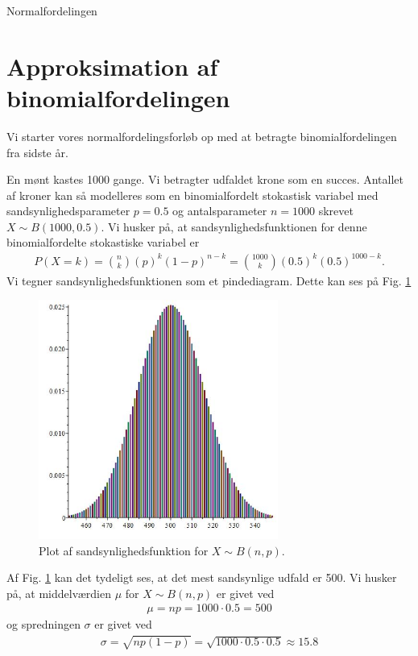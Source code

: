 \begin{center}
	\Huge
	Normalfordelingen
\end{center}
\section*{Approksimation af binomialfordelingen}
Vi starter vores normalfordelingsforløb op med at betragte binomialfordelingen fra sidste år.

\begin{exa}\label{exa:bin1}
	En mønt kastes 1000 gange. Vi betragter udfaldet krone som en succes. Antallet af kroner kan så modelleres som en binomialfordelt stokastisk variabel med sandsynlighedsparameter $p = 0.5$ og
	antalsparameter $n = 1000$ skrevet $X \sim B(1000,0.5)$. Vi husker på, at sandsynlighedsfunktionen for denne binomialfordelte stokastiske variabel er
	\begin{align*}
		P(X=k) =\binom{n}{k}(p)^k(1-p)^{n-k}= \binom{1000}{k}(0.5)^k(0.5)^{1000-k}.
	\end{align*}
	Vi tegner sandsynlighedsfunktionen som et pindediagram. Dette kan ses på Fig. \ref{fig:binompinde}
	\begin{figure}[H]
		\center
		\includegraphics[width=0.7\textwidth]{Billeder/binompinde.jpg}
		\caption{Plot af sandsynlighedsfunktion for $X \sim B(n,p)$.}
		\label{fig:binompinde}
	\end{figure}
	Af Fig. \ref{fig:binompinde} kan det tydeligt ses, at det mest sandsynlige udfald er 500. 
	Vi husker på, at middelværdien $\mu$ for $X \sim B(n,p)$ er givet ved
	\begin{align*}
		\mu = np = 1000\cdot 0.5 = 500
	\end{align*}
	og spredningen $\sigma$ er givet ved
	\begin{align*}
		\sigma = \sqrt{np(1-p)} = \sqrt{1000\cdot 0.5\cdot 0.5} \approx 15.8
	\end{align*}		
\end{exa}

